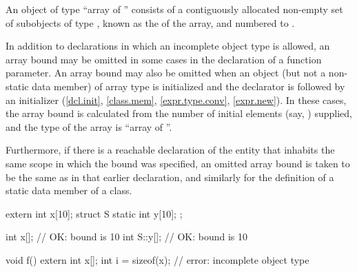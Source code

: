 \pnum
An object of type ``array of  '' consists of
a contiguously allocated non-empty set
of  subobjects of type ,
known as the  of the array,
and numbered  to .

\pnum
In addition to declarations in which an incomplete object type is allowed,
an array bound may be omitted in some cases in the declaration of a function
parameter.
An array bound may also be omitted
when an object (but not a non-static data member) of array type is initialized
and the declarator is followed by an initializer
(\ref{dcl.init}, \ref{class.mem}, \ref{expr.type.conv}, \ref{expr.new}).
%
In these cases, the array bound is calculated
from the number of initial elements (say, )
supplied,
and the type of the array is ``array of  ''.

\pnum
Furthermore, if there is a reachable declaration of the entity that inhabits the same
scope in which the bound was specified, an omitted array bound is taken to
be the same as in that earlier declaration, and similarly for the definition
of a static data member of a class.
\begin{example}
\begin{codeblock}
extern int x[10];
struct S {
  static int y[10];
};

int x[];                // OK: bound is 10
int S::y[];             // OK: bound is 10

void f() {
  extern int x[];
  int i = sizeof(x);    // error: incomplete object type
}
\end{codeblock}
\end{example}

